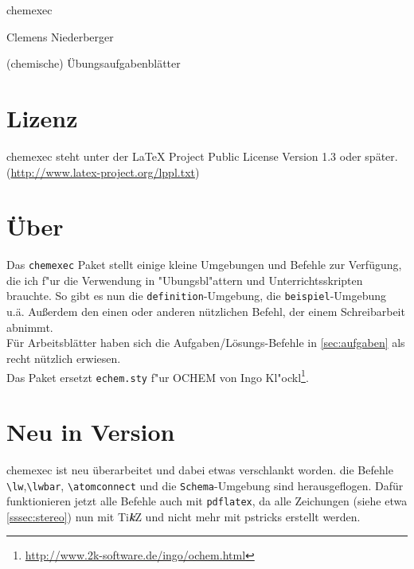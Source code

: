 \documentclass[a4paper,10pt,headsepline]{scrartcl}
\newcommand{\TikZ}{\mbox{Ti{\bfseries\itshape k}Z}\xspace}
\newcommand{\CEx}[1][8]{%
{\color{dunkelrot}\fontfamily{pag}\fontsize{#1}{#1}\selectfont chemexec}\xspace
}
\let\saveversion\CEversion
\def\CEversion{\saveversion\xspace}
\begin{document}
\begin{titlepage}
  \begin{center}
    \vspace*{-1.5cm}
    \CEx[45]\par
    \Large\CEversion\par\bigskip
    \footnotesize{}\par
    \normalsize Clemens Niederberger\par\vskip1.5cm
    \color{white}\huge (chemische) \"Ubungsaufgabenbl\"atter%
  \end{center}
  \vskip3cm
  
\end{titlepage}

\tableofcontents

\section{Lizenz}
\CEx \CEversion steht unter der LaTeX Project Public License Version 1.3 oder sp\"ater.\newline(\url{http://www.latex-project.org/lppl.txt})

\section{\"Uber}
Das \verb=chemexec= Paket stellt einige kleine Umgebungen und Befehle zur Ver\-f\"u\-gung, die ich f"ur die Verwendung in "Ubungsbl"attern und Unterrichtsskripten brauchte. So gibt es nun die \verb=definition=-Umgebung, die \verb=beispiel=-Um\-ge\-bung u.\"a. Au\ss{}erdem den einen oder anderen n\"utzlichen Befehl, der einem Schreibarbeit abnimmt.\\
F\"ur Arbeitsbl\"atter haben sich die Aufgaben/L\"osungs-Befehle in \ref{sec:aufgaben} als recht n\"utzlich erwiesen.\\
Das Paket ersetzt \verb=echem.sty= f"ur OCHEM von Ingo Kl"ockl\footnote{\url{http://www.2k-software.de/ingo/ochem.html}}.

\section{Neu in Version \CEversion}
\CEx ist neu \"uberarbeitet und dabei etwas verschlankt worden. die Befehle \verb=\lw=,\linebreak\verb=\lwbar=, \verb=\atomconnect= und die \verb=Schema=-Umgebung sind herausgeflogen. Dafür funktionieren jetzt alle Befehle auch mit \verb=pdflatex=, da alle Zeichungen (siehe etwa \ref{sssec:stereo}) nun mit \TikZ und nicht mehr mit pstricks erstellt werden.
\end{document}
